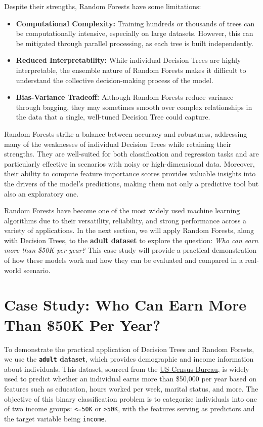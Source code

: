 \documentclass[
]{book}
\newcommand{\passthrough}[1]{#1}
\providecommand{\tightlist}{%
  \setlength{\itemsep}{0pt}\setlength{\parskip}{0pt}}
\theoremstyle{definition}
\theoremstyle{definition}
\theoremstyle{definition}
\theoremstyle{definition}
\theoremstyle{remark}
\begin{document}
Despite their strengths, Random Forests have some limitations:

\begin{itemize}
\tightlist
\item
  \textbf{Computational Complexity:} Training hundreds or thousands of trees can be computationally intensive, especially on large datasets. However, this can be mitigated through parallel processing, as each tree is built independently.\\
\item
  \textbf{Reduced Interpretability:} While individual Decision Trees are highly interpretable, the ensemble nature of Random Forests makes it difficult to understand the collective decision-making process of the model.\\
\item
  \textbf{Bias-Variance Tradeoff:} Although Random Forests reduce variance through bagging, they may sometimes smooth over complex relationships in the data that a single, well-tuned Decision Tree could capture.
\end{itemize}

Random Forests strike a balance between accuracy and robustness, addressing many of the weaknesses of individual Decision Trees while retaining their strengths. They are well-suited for both classification and regression tasks and are particularly effective in scenarios with noisy or high-dimensional data. Moreover, their ability to compute feature importance scores provides valuable insights into the drivers of the model's predictions, making them not only a predictive tool but also an exploratory one.

Random Forests have become one of the most widely used machine learning algorithms due to their versatility, reliability, and strong performance across a variety of applications. In the next section, we will apply Random Forests, along with Decision Trees, to the \textbf{adult dataset} to explore the question: \emph{Who can earn more than \$50K per year?} This case study will provide a practical demonstration of how these models work and how they can be evaluated and compared in a real-world scenario.

\section{Case Study: Who Can Earn More Than \$50K Per Year?}\label{case-study-who-can-earn-more-than-50k-per-year}

To demonstrate the practical application of Decision Trees and Random Forests, we use the \textbf{\passthrough{\lstinline!adult!} dataset}, which provides demographic and income information about individuals. This dataset, sourced from the \href{https://www.census.gov}{US Census Bureau}, is widely used to predict whether an individual earns more than \$50,000 per year based on features such as education, hours worked per week, marital status, and more. The objective of this binary classification problem is to categorize individuals into one of two income groups: \passthrough{\lstinline!<=50K!} or \passthrough{\lstinline!>50K!}, with the features serving as predictors and the target variable being \passthrough{\lstinline!income!}.
\end{document}
